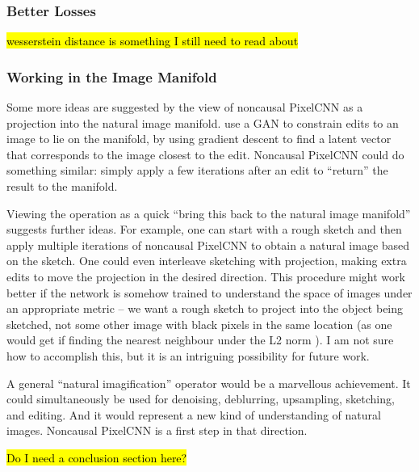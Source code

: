 \documentclass[10pt,a4paper]{article}
\newcommand{\nquote}[1]{``{#1}''}
\begin{document}
\subsubsection{Better Losses}

\hl{wesserstein distance is something I still need to read about}

\subsubsection{Working in the Image Manifold}

Some more ideas are suggested by the view of noncausal PixelCNN as a projection into the natural image manifold. \cite{manifoldmanipulation} use a GAN to constrain edits to an image to lie on the manifold, by using gradient descent to find a latent vector that corresponds to the image closest to the edit. Noncausal PixelCNN could do something similar: simply apply a few iterations after an edit to \nquote{return} the result to the manifold.

Viewing the operation as a quick \nquote{bring this back to the natural image manifold} suggests further ideas. For example, one can start with a rough sketch and then apply multiple iterations of noncausal PixelCNN to obtain a natural image based on the sketch. One could even interleave sketching with projection, making extra edits to move the projection in the desired direction. This procedure might work better if the network is somehow trained to understand the space of images under an appropriate metric -- we want a rough sketch to project into the object being sketched, not some other image with black pixels in the same location (as one would get if finding the nearest neighbour under the L2 norm \cite{??}). I am not sure how to accomplish this, but it is an intriguing possibility for future work.

A general \nquote{natural imagification} operator would be a marvellous achievement. It could simultaneously be used for denoising, deblurring, upsampling, sketching, and editing. And it would represent a new kind of understanding of natural images. Noncausal PixelCNN is a first step in that direction.

\hl{Do I need a conclusion section here?}


\end{document}
